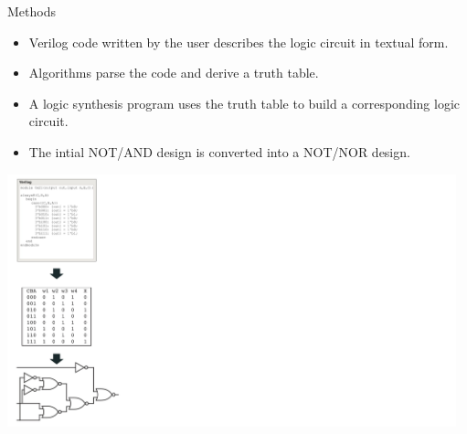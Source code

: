 \documentclass[10pt]{beamer}
\begin{document}
\begin{frame}{Methods}

    \begin{minipage}{.6\textwidth}
        \centering
        \begin{itemize}
            \item Verilog code written by the user describes the logic circuit in textual form. 
            \item Algorithms parse the code and derive a truth table. 
            \item A logic synthesis program uses the truth table to build a corresponding logic circuit. 
            \item The intial NOT/AND design is converted into a NOT/NOR design. 
        \end{itemize}
    \end{minipage}%
    \begin{minipage}{.4\textwidth}
        \centering
        \includegraphics[width=13cm]{overview1.jpg}
    \end{minipage}

\nocite{Nielsen2016GeneticAutomation} 
\end{frame}
\end{document}
